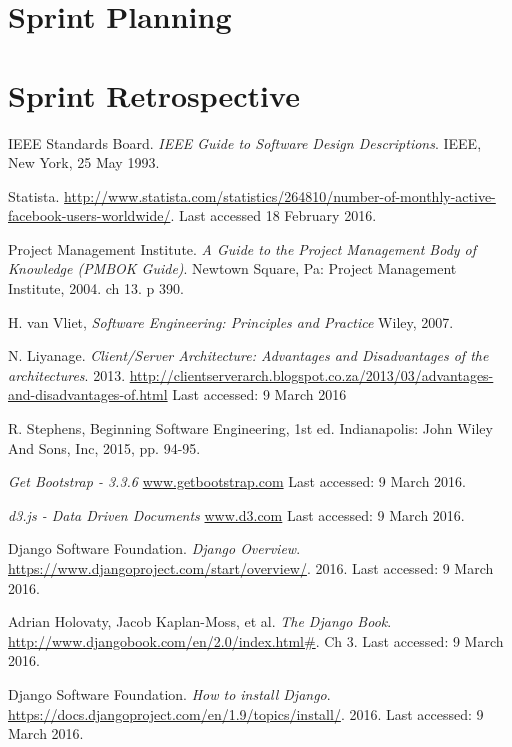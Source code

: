 \documentclass[12pt,onecolumn]{article}
\begin{document}
\section{Sprint Planning} %

\section{Sprint Retrospective} %

\begin{thebibliography}{1}
	 IEEE Standards Board. \emph{IEEE Guide to Software Design Descriptions}. IEEE, New York, 25 May 1993.
	
	 Statista. \url {http://www.statista.com/statistics/264810/number-of-monthly-active-facebook-users-worldwide/}. Last accessed 18 February 2016. 

	 Project Management Institute. \emph{A Guide to the Project Management Body of Knowledge (PMBOK Guide)}. Newtown Square, Pa: Project Management Institute, 2004. ch 13. p 390.

	 H. van Vliet, \emph{Software Engineering: Principles and Practice} Wiley, 2007.
	
	 N. Liyanage. \emph{Client/Server Architecture: Advantages and Disadvantages of the architectures}. 2013. \url{http://clientserverarch.blogspot.co.za/2013/03/advantages-and-disadvantages-of.html} Last accessed: 9 March 2016
	
	 R. Stephens, Beginning Software Engineering, 1st ed. Indianapolis: John Wiley And Sons, Inc, 2015, pp. 94-95.
	
	  \emph{Get Bootstrap - 3.3.6} \url{www.getbootstrap.com} Last accessed: 9 March 2016.
	
	  \emph{d3.js - Data Driven Documents} \url{www.d3.com} Last accessed: 9 March 2016.
	
	 Django Software Foundation. \emph{Django Overview}. \url{https://www.djangoproject.com/start/overview/}. 2016. Last accessed: 9 March 2016. 
	
	 Adrian Holovaty, Jacob Kaplan-Moss, et al. \emph{The Django Book}. \url{http://www.djangobook.com/en/2.0/index.html#}. Ch 3. Last accessed: 9 March 2016.
	
	 Django Software Foundation. \emph{How to install Django}. \url{https://docs.djangoproject.com/en/1.9/topics/install/}. 2016. Last accessed: 9 March 2016.	
	

\end{thebibliography}
\end{document}
